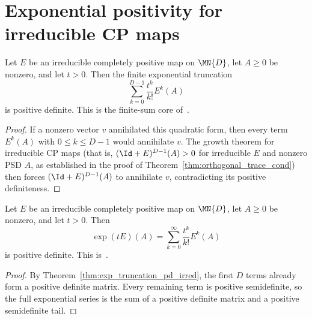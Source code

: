 \section{Exponential positivity for irreducible CP maps}

\begin{theorem}
    \label{thm:exp_truncation_pd_irred}
    \leanok
    Let $E$ be an irreducible completely positive map on $\MN{D}$,
    let $A \ge 0$ be nonzero, and let $t > 0$.
    Then the finite exponential truncation
    \[
        \sum_{k=0}^{D-1} \frac{t^k}{k!} E^k(A)
    \]
    is positive definite.
    This is the finite-sum core of~\cite[Theorem~6.2(3)]{Wolf2012Quantum}.
\end{theorem}

\begin{proof}
    \leanok
    If a nonzero vector $v$ annihilated this quadratic form, then every term
    $E^k(A)$ with $0 \le k \le D-1$ would annihilate $v$.
    The growth theorem for irreducible CP maps
        (that is, $(\Id + E)^{D-1}(A) > 0$ for irreducible $E$ and nonzero
        PSD $A$, as established in the proof of
        Theorem~\ref{thm:orthogonal_trace_cond}) then forces
    $(\Id + E)^{D-1}(A)$ to annihilate $v$, contradicting its positive
    definiteness.
\end{proof}

\begin{theorem}
    \label{thm:exp_pd_irred}
    \leanok
    Let $E$ be an irreducible completely positive map on $\MN{D}$,
    let $A \ge 0$ be nonzero, and let $t > 0$.
    Then
    \[
        \exp(tE)(A) = \sum_{k=0}^{\infty} \frac{t^k}{k!} E^k(A)
    \]
    is positive definite.
    This is~\cite[Theorem~6.2(3)]{Wolf2012Quantum}.
\end{theorem}

\begin{proof}
    \leanok
    By Theorem~\ref{thm:exp_truncation_pd_irred}, the first $D$ terms already
    form a positive definite matrix.
    Every remaining term is positive semidefinite, so the full exponential
    series is the sum of a positive definite matrix and a positive semidefinite
    tail.
\end{proof}

